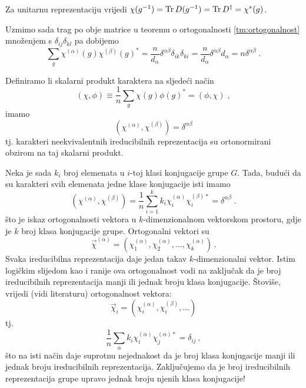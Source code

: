 Za unitarnu reprezentaciju vrijedi $\chi(g^{-1}) = \operatorname{Tr} D(g^{-1})= \operatorname{Tr} D^{\dagger}
    = \chi^{*}(g)$.


Uzmimo sada trag po obje matrice
u teoremu o ortogonalnosti \ref{tm:ortogonalnost} množenjem
s $\delta_{ij}\delta_{kl}$ pa dobijemo
\begin{displaymath}
\sum_g \chi^{(\alpha)}(g) \chi^{(\beta)}(g)^* = 
\frac{n}{d_{\alpha}} \delta^{\alpha\beta} \delta_{ik}\delta_{ki} =
\frac{n}{d_{\alpha}} \delta^{\alpha\beta} d_{\alpha} =
n \delta^{\alpha\beta} \;.
\end{displaymath}

Definiramo li skalarni produkt karaktera na sljedeći način
 \begin{displaymath}
(\chi, \phi) \equiv \frac{1}{n} \sum_g \chi(g) \phi(g)^* = (\phi, \chi) \;,
\end{displaymath}
imamo
\begin{displaymath}
(\chi^{(\alpha)}, \chi^{(\beta)}) = \delta^{\alpha\beta}
\end{displaymath}
tj. karakteri neekvivalentnih ireducibilnih reprezentacija su ortonormirani
obzirom na taj skalarni produkt.

Neka je sada $k_i$ broj elemenata u $i$-toj klasi konjugacije grupe $G$.
Tada, budući da su karakteri svih elemenata jedne klase konjugacije
isti imamo
\begin{displaymath}
(\chi^{(\alpha)}, \chi^{(\beta)})=\frac{1}{n} \sum_{i=1}^{k}  k_i
 \chi^{(\alpha)}_i \chi^{(\beta)*}_{i} = \delta^{\alpha\beta} \;.
\end{displaymath}
što je iskaz ortogonalnosti vektora u $k$-dimenzionalnom vektorskom
prostoru, gdje je $k$ broj klasa konjugacije grupe. Ortogonalni vektori su
\begin{displaymath}
\vec{\chi}^{(\alpha)} = (\chi^{(\alpha)}_1, \chi^{(\alpha)}_2, \ldots,
 \chi^{(\alpha)}_{k}) \,.
\end{displaymath}
Svaka ireducibilna reprezentacija daje jedan takav $k$-dimenzionalni vektor.
Istim logičkim slijedom kao i ranije ova ortogonalnost vodi na zaključak 
da je broj
ireducibilnih reprezentacija  manji ili jednak broju klasa konjugacije. Štoviše, vrijedi
(vidi literaturu) ortogonalnost vektora:
\begin{displaymath}
\vec{\chi}_i = (\chi^{(\alpha)}_i, \chi^{(\beta)}_i, \ldots)
\end{displaymath}
tj.
\begin{displaymath}
\frac{1}{n} \sum_{\alpha} k_i \chi^{(\alpha)}_i \chi^{(\alpha)*}_j =
\delta_{ij} \,,
\end{displaymath}
što na isti način daje suprotnu nejednakost da je broj klasa konjugacije manji
ili jednak broju ireducibilnih reprezentacija.
Zaključujemo da je broj ireducibilnih reprezentacija grupe 
upravo jednak broju njenih klasa konjugacije!

